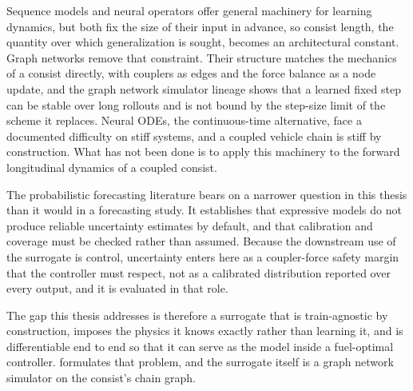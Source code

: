 Sequence models and neural operators offer general machinery for learning dynamics, but both fix the size of their input in advance, so consist length, the quantity over which generalization is sought, becomes an architectural constant. Graph networks remove that constraint. Their structure matches the mechanics of a consist directly, with couplers as edges and the force balance as a node update, and the graph network simulator lineage shows that a learned fixed step can be stable over long rollouts and is not bound by the step-size limit of the scheme it replaces. Neural ODEs, the continuous-time alternative, face a documented difficulty on stiff systems, and a coupled vehicle chain is stiff by construction. What has not been done is to apply this machinery to the forward longitudinal dynamics of a coupled consist.

The probabilistic forecasting literature bears on a narrower question in this thesis than it would in a forecasting study. It establishes that expressive models do not produce reliable uncertainty estimates by default, and that calibration and coverage must be checked rather than assumed. Because the downstream use of the surrogate is control, uncertainty enters here as a coupler-force safety margin that the controller must respect, not as a calibrated distribution reported over every output, and it is evaluated in that role.

The gap this thesis addresses is therefore a surrogate that is train-agnostic by construction, imposes the physics it knows exactly rather than learning it, and is differentiable end to end so that it can serve as the model inside a fuel-optimal controller.  formulates that problem, and the surrogate itself is a graph network simulator on the consist's chain graph.
